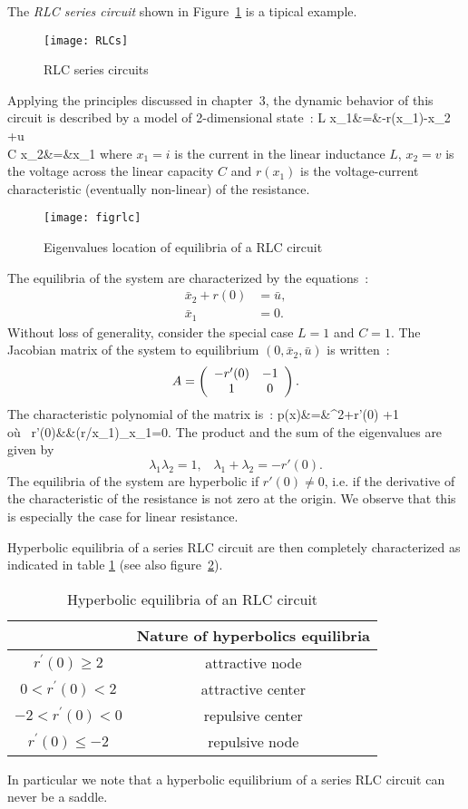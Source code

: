 The {\em RLC series circuit} shown in Figure~\ref{fig:RLCs} is a tipical example.
\begin{figure}[htbp] 
   \centering
   \texttt{[image: RLCs]} 
   \caption{RLC series circuits}
   \label{fig:RLCs}
\end{figure}
Applying the principles discussed in chapter~3, the dynamic behavior of this circuit is described by a model
of 2-dimensional state~:
\eqnn
L \dot x_1&=&-r(x_1)-x_2 +u\\
C \dot x_2&=&x_1
\eeqnn
where $x_1=i$ is the current in the linear inductance $L$, $x_2=v$ is the voltage across the linear capacity $C$ and $r(x_1)$ is the voltage-current characteristic (eventually non-linear)
of the resistance.
\begin{figure}[t] 
   \centering
   \texttt{[image: figrlc]} 
   \caption{Eigenvalues location of equilibria of a RLC circuit}
   \label{fig:figrlc}
\end{figure}

The equilibria of the system are characterized by the equations~:
\begin{align*}
\bar x_2 +r(0) &= \bar u,\\
\bar x_1 &= 0.
\end{align*}
Without loss of generality, consider the special case $L=1$ and $C=1$. 
The Jacobian matrix of the system to equilibrium $(0,\bar x_2,\bar u)$ is written~:
$$A=\bma{cc} -r'(0) & -1\\1&0\ema .$$
The characteristic polynomial of the matrix is~:
\eqnn
p(x)&=&\lambda^2+r'(0) \lambda +1\\
\mbox{o{ù} }\;\; r'(0)&\triangleq&(\partial r/\partial x_1)_{x_1=0}.
\eeqnn
The product and the sum of the eigenvalues are given by
$$ \lambda_1\lambda_2=1,  \;\;\; \lambda_1+\lambda_2=-r'(0).$$
The equilibria of the system are hyperbolic if $r'(0)\neq 0$, 
i.e. if the derivative of the characteristic of the resistance is not
zero at the origin. We observe that this is especially the case for
linear resistance.

Hyperbolic equilibria of a series RLC circuit are then completely characterized as indicated in table \ref{tabrlc} 
(see also figure~\ref{fig:figrlc}).
\begin{table}
\centering
\renewcommand{\arraystretch}{3.0}
\begin{tabular}{|c|c|}
\hline
&Nature of hyperbolics equilibria\\ \hline
$r^{'}(0) \geq 2$&attractive node \\ \hline
$0 < r^{'}(0) < 2$&attractive center \\ \hline
$-2 < r^{'}(0) < 0$&repulsive center \\ \hline
$r^{'}(0) \leq -2 $& repulsive node\\
\hline
\end{tabular}
\caption{Hyperbolic equilibria of an RLC circuit}\label{tabrlc}
\end{table}
In particular we note that a hyperbolic equilibrium of a series RLC circuit can never be a saddle.

